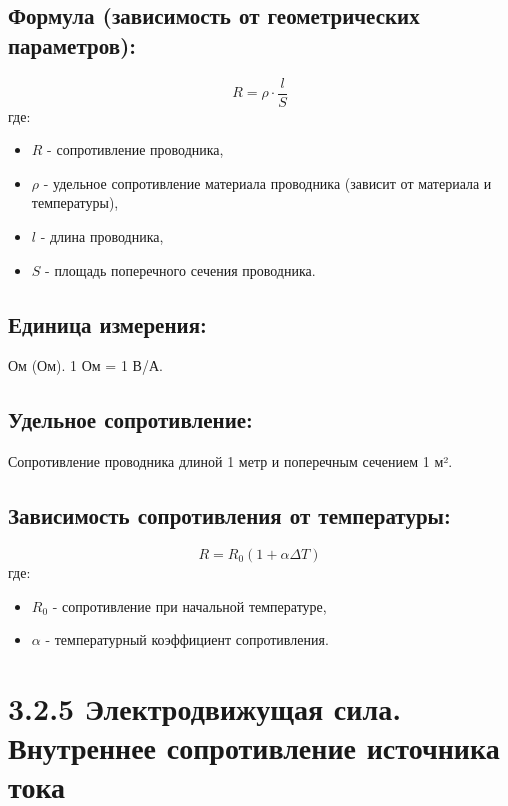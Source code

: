 \documentclass[a4paper,12pt]{article}
\begin{document}
\subsection*{Формула (зависимость от геометрических параметров):}
\vspace{-3pt}
\vspace{-0.05em}
$$ R = \rho \cdot \frac{l}{S} $$
где:
\begin{itemize}
    \item $R$ - сопротивление проводника,
    \item $\rho$ - удельное сопротивление материала проводника (зависит от материала и температуры),
    \item $l$ - длина проводника,
    \item $S$ - площадь поперечного сечения проводника.
\end{itemize}

\vspace{-9pt}
\subsection*{Единица измерения:}
\vspace{-3pt}
Ом (Ом). 1 Ом = 1 В/А.

\vspace{-9pt}
\subsection*{Удельное сопротивление:}
\vspace{-3pt}
Сопротивление проводника длиной 1 метр и поперечным сечением 1 м².

\vspace{-9pt}
\subsection*{Зависимость сопротивления от температуры:}
\vspace{-3pt}
\vspace{-0.05em}
$$ R = R_0(1+\alpha\Delta T) $$
где:
\begin{itemize}
    \item $R_0$ - сопротивление при начальной температуре,
    \item $\alpha$ - температурный коэффициент сопротивления.
\end{itemize}

\newpage
\section*{3.2.5 Электродвижущая сила. Внутреннее сопротивление источника тока}
\vspace{-9pt}
\end{document}
